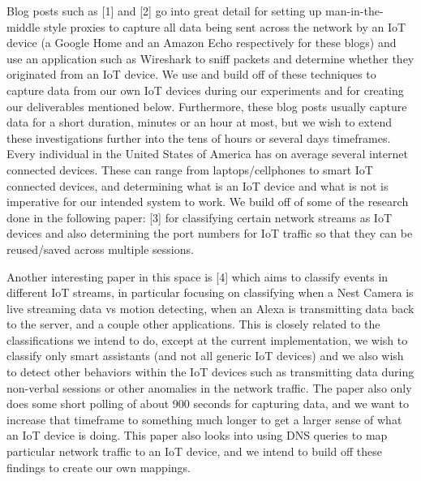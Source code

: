 \documentclass[letterpaper,twocolumn,10pt]{article}
\begin{document}
Blog posts such as [1] and [2] go into great detail for setting up man-in-the-middle style proxies to capture all data being sent across the network by an IoT device (a Google Home and an Amazon Echo respectively for these blogs) and use an application such as Wireshark to sniff packets and determine whether they originated from an IoT device. We use and build off of these techniques to capture data from our own IoT devices during our experiments and for creating our deliverables mentioned below. Furthermore, these blog posts usually capture data for a short duration, minutes or an hour at most, but we wish to extend these investigations further into the tens of hours or several days timeframes.
Every individual in the United States of America has on average several internet connected devices. These can range from laptops/cellphones to smart IoT connected devices, and determining what is an IoT device and what is not is imperative for our intended system to work. We build off of some of the research done in the following paper: [3] for classifying certain network streams as IoT devices and also determining the port numbers for IoT traffic so that they can be reused/saved across multiple sessions.

Another interesting paper in this space is [4] which aims to classify events in different IoT streams, in particular focusing on classifying when a Nest Camera is live streaming data vs motion detecting, when an Alexa is transmitting data back to the server, and a couple other applications. This is closely related to the classifications we intend to do, except at the current implementation, we wish to classify only smart assistants (and not all generic IoT devices) and we also wish to detect other behaviors within the IoT devices such as transmitting data during non-verbal sessions or other anomalies in the network traffic. The paper also only does some short polling of about 900 seconds for capturing data, and we want to increase that timeframe to something much longer to get a larger sense of what an IoT device is doing. This paper also looks into using DNS queries to map particular network traffic to an IoT device, and we intend to build off these findings to create our own mappings.
\end{document}
